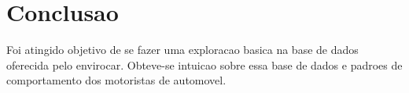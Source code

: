 \documentclass[10pt, conference]{IEEEtran}
\begin{document}


%



%


\section{Conclusao}
%

Foi atingido objetivo de se fazer uma exploracao basica na base de dados oferecida pelo envirocar. Obteve-se 
intuicao sobre essa base de dados e padroes de comportamento dos motoristas de automovel. 
\end{document}
